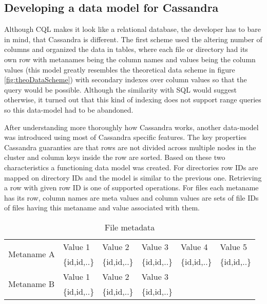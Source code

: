 \subsection{Developing a data model for Cassandra}

Although CQL makes it look like a relational database, the developer has to bare in mind, that
Cassandra is different. The first scheme used the altering number of columns and organized the 
data in tables, where each file or directory had its own row with metanames being the column
names and values being the column values (this model greatly resembles the theoretical data 
scheme in figure \ref{fig:theoDataScheme}) with secondary indexes over column values so that 
the query would be possible. Although the similarity with SQL would suggest otherwise, 
it turned out that this kind of indexing does not support range queries so this data-model
had to be abandoned. 

After understanding more thoroughly how Cassandra works, another data-model was introduced 
using most of Cassandra specific features. The key properties Cassandra guaranties are that 
rows are not divided across multiple nodes in the cluster and column keys inside the row
are sorted. Based on these two characteristics a functioning data model was created. For  
directories row IDs are mapped on directory IDs and the model is similar to the previous one. 
Retrieving a row with given row ID is one of supported operations.
For files each metaname has its row, column names are meta values and column values are sets of 
file IDs of files having this metaname and value associated with them. 

\begin{table}[h]
\centering
\begin{tabular}{|l|l|l|l|ll}
\hline
\multirow{2}{*}{Metaname A} & Value 1      & Value 2      & Value 3      & \multicolumn{1}{l|}{Value 4}      & \multicolumn{1}{l|}{Value 5}      \\ \cline{2-6}
                            & \{id,id,..\} & \{id,id,..\} & \{id,id,..\} & \multicolumn{1}{l|}{\{id,id,..\}} & \multicolumn{1}{l|}{\{id,id,..\}} \\ \hline
\multirow{2}{*}{Metaname B} & Value 1      & Value 2      & Value 3      &                                   &                                   \\ \cline{2-4}
                            & \{id,id,..\} & \{id,id,..\} & \{id,id,..\} &                                   &                                   \\ \cline{1-4}
\end{tabular}
\caption{File metadata}
\label{tab:fileMeta}
\end{table}

